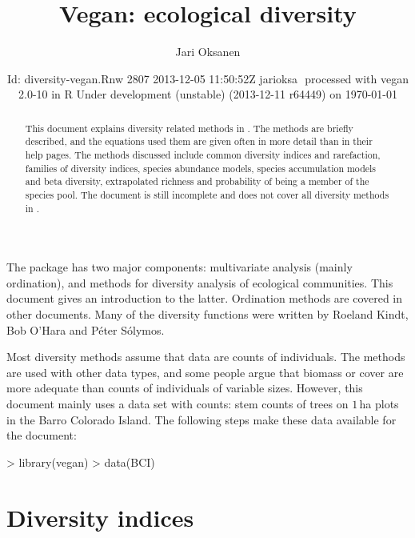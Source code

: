 \documentclass[a4paper,10pt,twocolumn]{article}
\title{Vegan: ecological diversity} \author{Jari Oksanen}
\date{\footnotesize{$ $Id: diversity-vegan.Rnw 2807 2013-12-05 11:50:52Z jarioksa $ $
  processed with vegan 2.0-10
  in R Under development (unstable) (2013-12-11 r64449) on \today}}
\begin{document}




\maketitle
\begin{abstract} 
  This document explains diversity related methods in
  . The methods are briefly described, and the equations
  used them are given often in more detail than in their help
  pages. The methods discussed include common diversity indices and
  rarefaction, families of diversity indices, species abundance
  models, species accumulation models and beta diversity, extrapolated
  richness and probability of being a member of the species pool. The
  document is still incomplete and does not cover all diversity
  methods in .
\end{abstract}
\tableofcontents


\noindent The  package has two major components:
multivariate analysis (mainly ordination), and methods for diversity
analysis of ecological communities.  This document gives an
introduction to the latter.  Ordination methods are covered in other
documents.  Many of the diversity functions were written by Roeland
Kindt, Bob O'Hara and P{\'e}ter S{\'o}lymos.

Most diversity methods assume that data are counts of individuals.
The methods are used with other data types, and some people argue that
biomass or cover are more adequate than counts of individuals of
variable sizes.  However, this document mainly uses a data set with
counts: stem counts of trees on $1$\,ha plots in the Barro Colorado
Island.  The following steps make these data available for the
document:
\begin{Schunk}
\begin{Sinput}
> library(vegan)
> data(BCI)
\end{Sinput}
\end{Schunk}

\section{Diversity indices}
\end{document}
